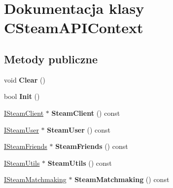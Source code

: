 \hypertarget{class_c_steam_a_p_i_context}{}\section{Dokumentacja klasy C\+Steam\+A\+P\+I\+Context}
\label{class_c_steam_a_p_i_context}
\subsection*{Metody publiczne}
\begin{DoxyCompactItemize}
\item 
\mbox{\label{class_c_steam_a_p_i_context_af49d55c19ff1d05f2e45b2dda7d643e9}} 
void {\bfseries Clear} ()
\item 
\mbox{\label{class_c_steam_a_p_i_context_acb3e54359e5e21076048b08072d8e14b}} 
bool {\bfseries Init} ()
\item 
\mbox{\label{class_c_steam_a_p_i_context_a8c4ece2d68667274560a9522d2cd1a06}} 
\hyperlink{class_i_steam_client}{I\+Steam\+Client} $\ast$ {\bfseries Steam\+Client} () const
\item 
\mbox{\label{class_c_steam_a_p_i_context_a840a4999ad1592cb27878292922553e6}} 
\hyperlink{class_i_steam_user}{I\+Steam\+User} $\ast$ {\bfseries Steam\+User} () const
\item 
\mbox{\label{class_c_steam_a_p_i_context_ae4e758b5e563055623297fdf5562e693}} 
\hyperlink{class_i_steam_friends}{I\+Steam\+Friends} $\ast$ {\bfseries Steam\+Friends} () const
\item 
\mbox{\label{class_c_steam_a_p_i_context_ae97ff78c1c3a200d8e0adcf7fc9f9df7}} 
\hyperlink{class_i_steam_utils}{I\+Steam\+Utils} $\ast$ {\bfseries Steam\+Utils} () const
\item 
\mbox{\label{class_c_steam_a_p_i_context_a9f487ba068d525775f5c984645b6342d}} 
\hyperlink{class_i_steam_matchmaking}{I\+Steam\+Matchmaking} $\ast$ {\bfseries Steam\+Matchmaking} () const
\item 
\mbox{\label{class_c_steam_a_p_i_context_a4b710165ba0041efd63d82b912363e3f}} 

\end{DoxyCompactItemize}
